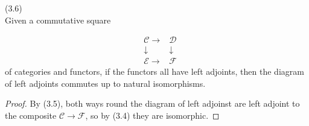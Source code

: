 \documentclass[a4paper]{article}
\begin{document}
\begin{coro} (3.6)\\
    Given a commutative square


    \begin{equation*}
        \begin{aligned}
            &\mathcal{C}\to &\mathcal{D}\\
            &\downarrow & \downarrow\\
            &\mathcal{E} \to &\mathcal{F}
        \end{aligned}
    \end{equation*}
    of categories and functors, if the functors all have left adjoints, then the diagram of left adjoints commutes up to natural isomorphisms.
    \begin{proof}
        By (3.5), both ways round the diagram of left adjoinst are left adjoint to the composite $\mathcal{C} \to \mathcal{F}$, so by (3.4) they are isomorphic.
    \end{proof}
\end{coro}
\end{document}
